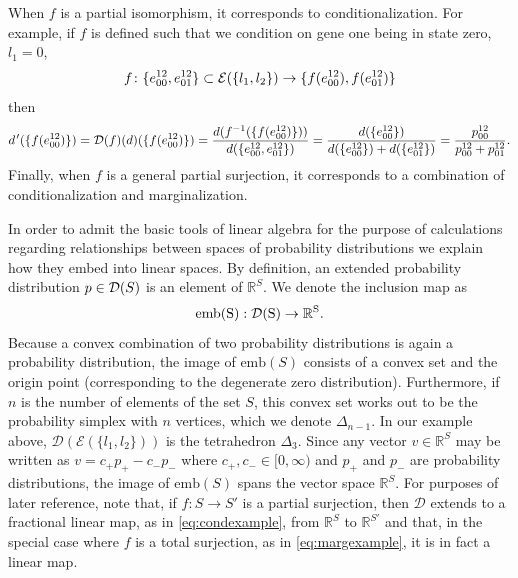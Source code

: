 When $f$ is a partial isomorphism, it corresponds to conditionalization. For example, if $f$ is defined such that we condition on gene one being in state zero, $l_1 = 0$,
\begin{equation}
f \colon \{ e^{12}_{00} , e^{12}_{01} \} \subset \mathcal{E} ( \{ l_1, l_2 \} ) \to \{ f(e^{12}_{00}) , f(e^{12}_{01}) \}
\end{equation}
then
\begin{equation}\label{eq:condexample}
d\hspace{.09em}'(\{ f(e^{12}_{00}) \} ) = \mathcal{D} (f)(d)( \{ f(e^{12}_{00}) \}) = \frac{d( f^{-1}( \{ f(e^{12}_{00}) \}) )}{d(\{ e^{12}_{00},e^{12}_{01} \})} = \frac{d(\{ e^{12}_{00} \})}{d( \{ e^{12}_{00} \} ) + d( \{ e^{12}_{01} \} )} = \frac{p^{12}_{00}}{p^{12}_{00} + p^{12}_{01}}.
\end{equation}
Finally, when $f$ is a general partial surjection, it corresponds to a combination of conditionalization and marginalization.

In order to admit the basic tools of linear algebra for the purpose of calculations regarding relationships between spaces of probability distributions we explain how they embed into linear spaces. By definition, an extended probability distribution $p \in \mathcal{D}(S)$ is an element of $\mathbb{R}^S$. We denote the inclusion map as
\begin{equation}\label{eq:emb}
\rm{emb}(S) : \mathcal{D}(S) \to \mathbb{R}^S.
\end{equation}
Because a convex combination of two probability distributions is again a probability distribution, the image of $\mathrm{emb}(S)$ consists of a convex set and the origin point (corresponding to the degenerate zero distribution).  Furthermore, if $n$ is the number of elements of the set $S$, this convex set works out to be the probability simplex with $n$ vertices, which we denote $\Delta_{n-1}$.  In our example above, $\mathcal{D}(\mathcal{E}(\{l_1,l_2\}))$ is the tetrahedron $\Delta_3$. Since any vector $v \in \mathbb{R}^S$ may be written as $v = c_{+} p_{+} - c_{-} p_{-}$ where $c_{+}, c_{-} \in [0,\infty)$ and $p_{+}$ and $p_{-}$ are probability distributions, the image of $\mathrm{emb}(S)$ spans the vector space $\mathbb{R}^S$.  For purposes of later reference, note that, if $f \colon S \to S'$ is a partial surjection, then $\mathcal{D}$ extends to a fractional linear map, as in \ref{eq:condexample}, from $\mathbb{R}^S$ to $\mathbb{R}^{S'}$ and that, in the special case where $f$ is a total surjection, as in \ref{eq:margexample}, it is in fact a linear map.


